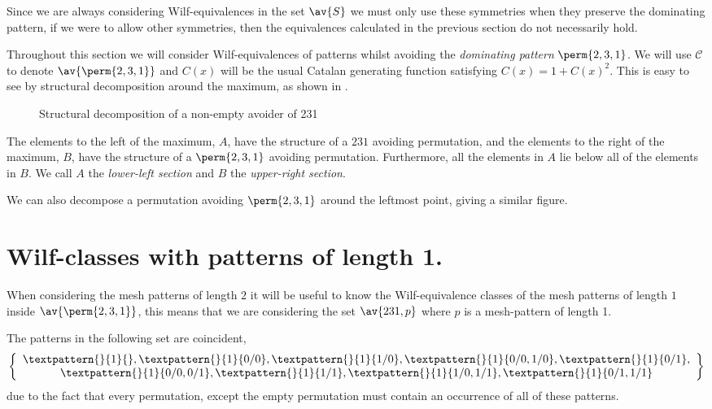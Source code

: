 Since we are always considering Wilf-equivalences in the set \(\av{S}\) we
must only use these symmetries when they preserve the dominating pattern, if we
were to allow other symmetries, then the equivalences calculated in the previous
section do not necessarily hold.

Throughout this section we will consider Wilf-equivalences of patterns
whilst avoiding the \emph{dominating pattern} \(\perm{2,3,1}\). We will
use \(\mathcal{C}\) to denote \(\av{\perm{2,3,1}}\) and \(C(x)\) will
be the usual Catalan generating function satisfying \(C(x) = 1 + C(x)^2\).
This is easy to see by structural decomposition around the maximum, as
shown in .

\begin{figure}[!ht]
    \centering
    \caption{Structural decomposition of a non-empty avoider of 231}
    \label{fig:decompmax}
\end{figure}

The elements to the left of the maximum, \(A\), have the structure of a \(231\)
avoiding permutation, and the elements to the right of the maximum, \(B\), have the
structure of a \(\perm{2,3,1}\) avoiding permutation. Furthermore, all the
elements in \(A\) lie below all of the elements in \(B\). We call \(A\) the
\emph{lower-left section} and \(B\) the \emph{upper-right section}.

We can also decompose a permutation avoiding \(\perm{2,3,1}\) around the leftmost
point, giving a similar figure.

\section{Wilf-classes with patterns of length 1.}
When considering the mesh patterns of length \(2\) it will be useful to know
the Wilf-equivalence classes of the mesh patterns of length \(1\) inside
\(\av{\perm{2,3,1}}\), this means that we are considering the set \(\av{231,p}\)
where \(p\) is a mesh-pattern of length 1.

The patterns in the following set are coincident,
\begin{equation*}
    \left\{
        \begin{array}{c}
        \textpattern{}{1}{},
        \textpattern{}{1}{0/0},
        \textpattern{}{1}{1/0},
        \textpattern{}{1}{0/0,1/0},
        \textpattern{}{1}{0/1},\\
        \textpattern{}{1}{0/0,0/1},
        \textpattern{}{1}{1/1},
        \textpattern{}{1}{1/0,1/1},
        \textpattern{}{1}{0/1,1/1}
    \end{array}
    \right\}
\end{equation*}
due to the fact that every permutation, except the empty
permutation must contain an occurrence of all of these patterns.

